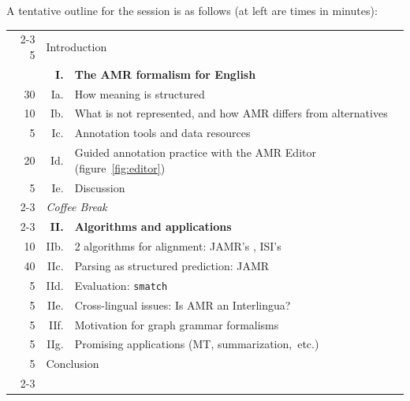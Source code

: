 \documentclass[11pt,letterpaper]{article}
\newcommand{\fref}[1]{figure~\ref{#1}}
\begin{document}
A tentative outline for the session is as follows 
(at left are times in minutes):
\begin{center}\small
\hypersetup{citecolor=mdblue}
\noindent\begin{tabular}{@{}r@{~~}|r@{~}p{19em}|@{}}
\cline{2-3}
5 & \multicolumn{2}{l|}{Introduction}\\
  & \textbf{I.} & \textbf{The AMR formalism for English} \citep{amr,amr-guidelines}\\
30 & Ia. & How meaning is structured\\
10 & Ib. & What is not represented, and how AMR differs from alternatives\\
 5 & Ic. & Annotation tools and data resources\\
20 & Id. & Guided annotation practice with the AMR Editor (\fref{fig:editor})\\
 5 & Ie. & Discussion\\
\cline{2-3}
\multicolumn{1}{@{}r}{15} & \multicolumn{2}{l}{\textit{Coffee Break}}\\
\cline{2-3}
  & \textbf{II.} & \textbf{Algorithms and applications}\\
10 & IIb. & 2 algorithms for alignment: JAMR's \citep{flanigan-14}, ISI's \citep{pourdamghani-14} \\
40 & IIc. & Parsing as structured prediction: JAMR \citep{flanigan-14} \\
 5 & IId. & Evaluation: \texttt{smatch} \citep{cai-13} \\
 5 & IIe. & Cross-lingual issues: Is AMR an Interlingua? \citep{xue-14} \\
 5 & IIf. & Motivation for graph grammar formalisms \citep{braune-14} \\
 5 & IIg. & Promising applications (MT, summarization,~etc.) \\
 5 & \multicolumn{2}{l|}{Conclusion}\\
\cline{2-3}
\end{tabular}
\end{center}
\end{document}
